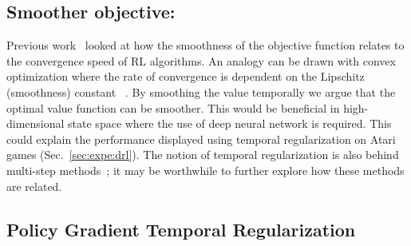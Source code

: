 \subsection{Smoother objective:}

Previous work~\citep{smooth_value} looked at how the smoothness of the objective function relates to the convergence speed of RL algorithms.  An analogy can be drawn with convex optimization where the rate of convergence is dependent on the Lipschitz (smoothness) constant ~\citep{boyd2004convex}. 
By smoothing the value temporally we argue that the optimal value function can be smoother. This would be beneficial in high-dimensional state space where the use of deep neural network is required. This could explain the performance displayed using temporal regularization on Atari games (Sec.~\ref{sec:expe:drl}).
The notion of temporal regularization is also behind multi-step methods~\citep{sutton1998reinforcement}; it may be worthwhile to further explore how these methods are related.

\subsection{Policy Gradient Temporal Regularization}

